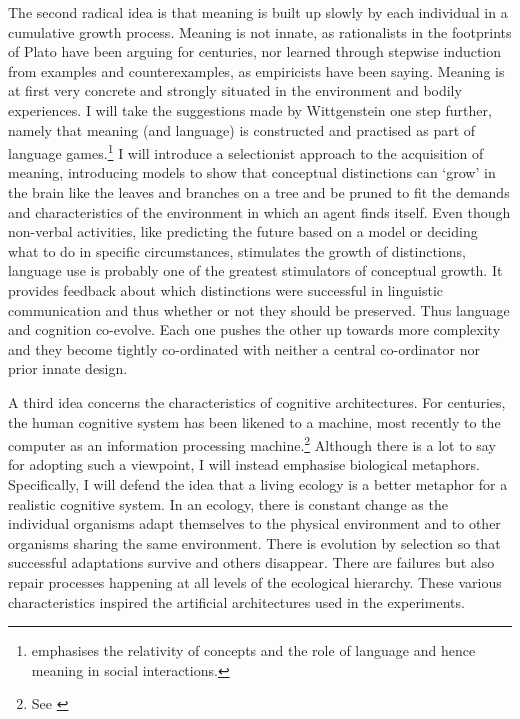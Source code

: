 The second radical idea is that 
meaning is built up slowly by each individual in a cumulative
growth process. Meaning is not innate, as rationalists in the 
footprints of Plato have been arguing for centuries, nor 
learned through stepwise
induction from examples and counterexamples, as empiricists
have been saying. Meaning is at first very concrete and
strongly situated in the environment and bodily experiences.
I will take the suggestions made
by Wittgenstein  one step further, namely that meaning (and language) is constructed
and practised as part of
language games.\footnote{\cite{Wittgenstein:1953} emphasises the relativity 
of concepts and the role of language and hence
meaning in social interactions.}
I will introduce a selectionist approach to
the acquisition of meaning, introducing models to 
show that conceptual distinctions can `grow' in the brain
like the leaves and branches on a tree and be pruned to fit the
demands and characteristics of the environment in which
an agent finds itself. Even though non-verbal 
activities, like predicting the future based on a model 
or deciding what to do in specific circumstances, stimulates
the growth of distinctions, language use is probably one 
of the greatest stimulators of conceptual growth. It provides
feedback about which distinctions were successful in linguistic
communication and thus whether or not they should be preserved. 
Thus language and cognition co-evolve. Each one pushes the other 
up towards more complexity and they become tightly 
co-ordinated with neither a central co-ordinator nor prior innate design. 

A third idea concerns the characteristics of
cognitive architectures.
For centuries, the human cognitive system has been 
likened to a machine, most recently to the computer as 
an information processing machine.\footnote{See \cite{Newell:1976}}
Although there is a lot to say for adopting such a 
viewpoint, I will instead emphasise biological metaphors. 
Specifically, I will defend the idea that a living ecology 
is a better metaphor for a realistic cognitive system. 
In an ecology, there is constant change as 
the individual organisms adapt themselves to the 
physical environment and to other organisms sharing 
the same environment. There is evolution by selection so 
that successful adaptations survive and others disappear. 
There are failures but also repair processes 
happening at all levels of the ecological 
hierarchy. These various characteristics inspired
the artificial architectures used in 
the experiments. 

